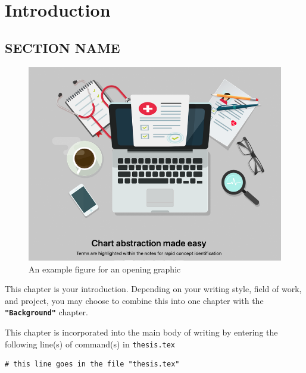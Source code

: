 \chapter{Introduction}

\section{SECTION NAME}
\begin{figure}
    \centering
    \includegraphics[width=0.8\linewidth]{Resources/Images/Banner1.png}
    \caption{An example figure for an opening graphic}
    \label{fig:emerse_banner1}
\end{figure}

This chapter is your introduction. Depending on your writing style, field of work, and project, you may choose to combine this into one chapter with the \texttt{\textbf{"Background"}} chapter.

This chapter is incorporated into the main body of writing by entering the following line(s) of command(s) in \texttt{thesis.tex}
\begin{verbatim}
# this line goes in the file "thesis.tex"

\end{verbatim}



